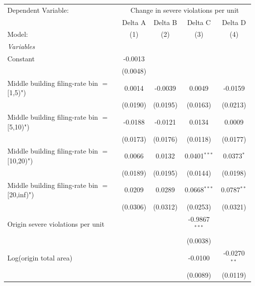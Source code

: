 \begingroup
\centering
\begin{tabular}{lcccc}
   \tabularnewline \midrule \midrule
   Dependent Variable: & \multicolumn{4}{c}{Change in severe violations per unit}\\
                                                  & Delta A  & Delta B  & Delta C         & Delta D \\   
   Model:                                         & (1)      & (2)      & (3)             & (4)\\  
   \midrule
   \emph{Variables}\\
   Constant                                       & -0.0013  &          &                 &   \\   
                                                  & (0.0048) &          &                 &   \\   
   Middle building filing-rate bin $=$ [1,5)")    & 0.0014   & -0.0039  & 0.0049          & -0.0159\\   
                                                  & (0.0190) & (0.0195) & (0.0163)        & (0.0213)\\   
   Middle building filing-rate bin $=$ [5,10)")   & -0.0188  & -0.0121  & 0.0134          & 0.0009\\   
                                                  & (0.0173) & (0.0176) & (0.0118)        & (0.0177)\\   
   Middle building filing-rate bin $=$ [10,20)")  & 0.0066   & 0.0132   & 0.0401$^{***}$  & 0.0373$^{*}$\\   
                                                  & (0.0189) & (0.0195) & (0.0144)        & (0.0198)\\   
   Middle building filing-rate bin $=$ [20,inf)") & 0.0209   & 0.0289   & 0.0668$^{***}$  & 0.0787$^{**}$\\   
                                                  & (0.0306) & (0.0312) & (0.0253)        & (0.0321)\\   
   Origin severe violations per unit              &          &          & -0.9867$^{***}$ &   \\   
                                                  &          &          & (0.0038)        &   \\   
   Log(origin total area)                         &          &          & -0.0100         & -0.0270$^{**}$\\   
                                                  &          &          & (0.0089)        & (0.0119)\\   

\end{tabular}
